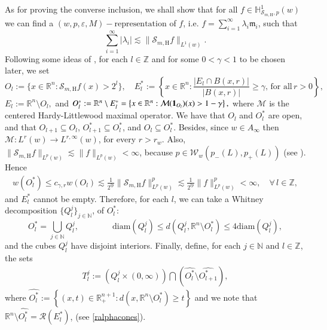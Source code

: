 \documentclass[11pt, a4paper,leqno]{amsart}
\newcommand{\mm}{\mathfrak{m}}
\renewcommand{\chi}{{\bf 1}}
\theoremstyle{plain}
\theoremstyle{definition}
\theoremstyle{remark}
\numberwithin{equation}{section}
\def \R{ \mathbb{R} }
\def \N{ \mathbb{N} }
\def \Z{ \mathbb{Z} }
\def \Scal{ \mathcal{S} }
\def \hh{ \mathrm{H} }
\def \p{ (w,p,\varepsilon,M)-\textrm{representation}}
\begin{document}
As for proving the converse inclusion,
we shall show that for all
$f\in \mathbb{H}^1_{\Scal_{m,\hh},p}(w)$  we can find a $\p$ of $f$, i.e. $f=\sum_{i=1}^{\infty}\lambda_i\mm_i$,
 such that
$$
\sum_{i=1}^{\infty}|\lambda_i|\lesssim \|\Scal_{m,\hh}f\|_{L^1(w)}.
$$
Following some ideas of \cite[Lemma 4.2]{HofmannMayboroda},
 for each $l\in \Z$ and for some $0<\gamma<1$ to be chosen later, we set
$$
O_l:=\{x\in \mathbb{R}^n:\Scal_{m,\hh}f(x)>2^l\}, \quad E_l^*:=\left\{x\in \mathbb{R}^n: \frac{|E_l\cap B(x,r)|}{|B(x,r)|}\geq \gamma,\, \textrm{for all}\,r>0\right\},
$$
$E_l:=\R^n\setminus O_l,$ and
$
O_l^*:=\R^n\setminus E_l^*=\left\{x\in \mathbb{R}^n: \mathcal{M}(\chi_{O_l})(x)>1-\gamma\right\},
$
where $\mathcal{M}$ is the centered Hardy-Littlewood maximal operator.
We have that $O_l$ and $O_l^*$
are open, and that $O_{l+1}\subseteq O_l$,
 $O_{l+1}^*\subseteq O_{l}^*$, and $O_l\subseteq O_l^*$.
 Besides, since $w\in A_{\infty}$ then $\mathcal{M}:L^r(w)\rightarrow L^{r,\infty}(w)$, for every $r>r_w$. Also, $\|\Scal_{m,\hh}f\|_{L^p(w)}\lesssim \|f\|_{L^p(w)}<\infty$, because $p\in\mathcal{W}_w(p_-(L),p_+(L))$ (see \cite[Theorem 1.12]{MartellPrisuelos}). Hence
    \begin{align}\label{OL}
    w(O^*_l)\leq c_{\gamma,r}w(O_l)\lesssim \frac{1}{2^{lp}}\|\Scal_{m,\hh}f\|_{L^p(w)}^p\lesssim \frac{1}{2^{lp}}\|f\|_{L^p(w)}^p<\infty, \quad \forall\, l\in \Z,
   \end{align}
and $E_l^*$ cannot be empty. Therefore, for each $l$, we can take 
  a Whitney decomposition $\{Q_l^j\}_{j\in \N}$,
  of $O_l^*$:
$$
O_l^*=\bigcup_{j\in \N}Q_l^j,\qquad \qquad\textrm{diam}(Q_l^j)\leq d(Q_l^j,\mathbb{R}^n\setminus O_l^*)\leq 4\textrm{diam}(Q_l^j),
$$
and the cubes $Q_l^j$ have disjoint interiors.
Finally, define, for each $j\in \N$ and $l\in \Z$, the sets
\begin{align}\label{T}
T_l^j:=(Q_l^j\times (0,\infty))\bigcap \left(\widehat{O_l^*}\setminus \widehat{O_{l+1}^{*}}\right),
\end{align}
where $\widehat{O_l^*}:=\left\{(x,t)\in \R_+^{n+1}: d(x,\mathbb{R}^n\setminus O_l^*)\geq t \right\}$ and we note that 
$\R^n\setminus \widehat{O_l^*}=\mathcal{R}(E_l^*)$, (see \eqref{ralphacones}).
\end{document}
